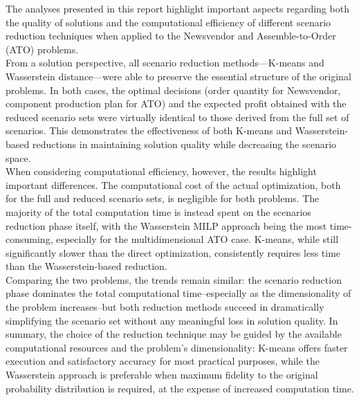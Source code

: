 \documentclass[a4paper,12pt]{article}
\begin{document}
	
	The analyses presented in this report highlight important aspects regarding both the quality of solutions and the computational efficiency of different scenario reduction techniques when applied to the Newsvendor and Assemble-to-Order (ATO) problems.\\
	
	From a solution perspective, all scenario reduction methods—K-means and Wasserstein distance—were able to preserve the essential structure of the original problems. In both cases, the optimal decisions (order quantity for Newsvendor, component production plan for ATO) and the expected profit obtained with the reduced scenario sets were virtually identical to those derived from the full set of scenarios. This demonstrates the effectiveness of both K-means and Wasserstein-based reductions in maintaining solution quality while decreasing the scenario space.\\
	
	When considering computational efficiency, however, the results highlight important differences. The computational cost of the actual optimization, both for the full and reduced scenario sets, is negligible for both problems. The majority of the total computation time is instead spent on the scenarios reduction phase itself, with the Wasserstein MILP approach being the most time-consuming, especially for the multidimensional ATO case. K-means, while still significantly slower than the direct optimization, consistently requires less time than the Wasserstein-based reduction.\\
	
	\noindent Comparing the two problems, the trends remain similar: the scenario reduction phase dominates the total computational time--especially as the dimensionality of the problem increases--but both reduction methods succeed in dramatically simplifying the scenario set without any meaningful loss in solution quality. In summary, the choice of the reduction technique may be guided by the available computational resources and the problem's dimensionality: K-means offers faster execution and satisfactory accuracy for most practical purposes, while the Wasserstein approach is preferable when maximum fidelity to the original probability distribution is required, at the expense of increased computation time.
	
\end{document}
